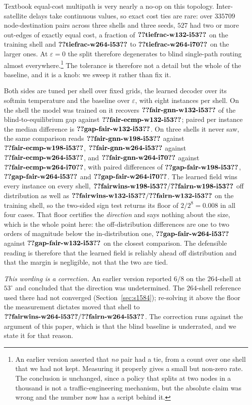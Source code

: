 \documentclass[journal]{IEEEtran}
\begin{document}
Textbook equal-cost multipath is very nearly a no-op on this topology. Inter-satellite delays
take continuous values, so exact cost ties are rare: over $335709$ node-destination pairs across
three shells and three seeds, $527$ had two or more out-edges of exactly equal cost, a fraction of
$\clm{tiefrac-w132-i53}$ on the training shell and $\clm{tiefrac-w264-i53}$ to $\clm{tiefrac-w264-i70}$ on the larger ones. At $\varepsilon=0$ the
split therefore degenerates to blind single-path routing almost everywhere.\footnote{An earlier
version asserted that \emph{no} pair had a tie, from a count over one shell that we had not kept.
Measuring it properly gives a small but non-zero rate. The conclusion is unchanged, since a policy
that splits at two nodes in a thousand is not a traffic-engineering mechanism, but the absolute
claim was wrong and the number now has a script behind it.} The tolerance is therefore not a
detail but the whole of the baseline, and it is a knob: we sweep it rather than fix it.

Both sides are tuned per shell over fixed grids, the learned decoder over its softmin temperature
and the baseline over $\varepsilon$, with eight instances per shell. On the shell the model was
trained on it recovers $\clm{fair-gnn-w132-i53}$ of the blind-to-equilibrium gap against $\clm{fair-ecmp-w132-i53}$; paired per instance the median difference is $\clm{gap-fair-w132-i53}$. On three shells it never saw, the same comparison reads $\clm{fair-gnn-w198-i53}$
against $\clm{fair-ecmp-w198-i53}$, $\clm{fair-gnn-w264-i53}$ against $\clm{fair-ecmp-w264-i53}$, and
$\clm{fair-gnn-w264-i70}$ against $\clm{fair-ecmp-w264-i70}$, with paired differences of
$\clm{gap-fair-w198-i53}$, $\clm{gap-fair-w264-i53}$ and $\clm{gap-fair-w264-i70}$. The learned field wins every instance on
every shell, $\clm{fairwins-w198-i53}/\clm{fairn-w198-i53}$ off distribution as well as
$\clm{fairwins-w132-i53}/\clm{fairn-w132-i53}$ on the training shell, so the two-sided sign
test returns its floor of $2/2^{8}=0.008$ in all four cases. That floor certifies the
\emph{direction} and says nothing about the size, which is the whole point here: the
off-distribution differences are one to two orders of magnitude below the in-distribution one,
$\clm{gap-fair-w264-i53}$ against $\clm{gap-fair-w132-i53}$ on the closest comparison. The
defensible reading is therefore that the learned field is reliably ahead off distribution and
that the margin is negligible, not that the two are tied.

\emph{This wording is a correction.} An earlier version reported $6/8$ on the
$264$-shell at $53^\circ$ and concluded that the direction was undetermined. The
$264$-shell reference used there had not converged (Section~\ref{sec:s1584}); re-solving it
above the floor the measurement dictates moved that shell to
$\clm{fairwins-w264-i53}/\clm{fairn-w264-i53}$. The correction runs against the argument of
this paper, which is that the blind baseline is underrated, and we state it for that reason.
\end{document}
